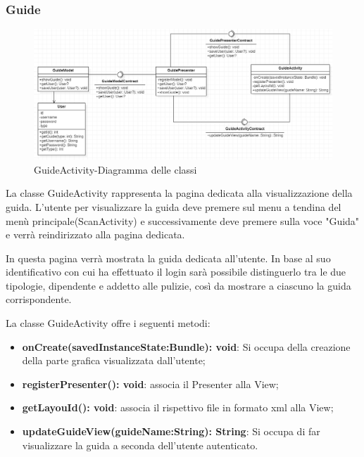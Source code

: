 \subsubsection{Guide}
\begin{figure}[H]
	\centering
	\includegraphics[width=16cm]{res/images/GuideClass.png}
	\caption{GuideActivity-Diagramma delle classi}
	\label{fig:GuideActivity-Diagramma delle classi}
\end{figure}
La classe GuideActivity rappresenta la pagina dedicata alla visualizzazione della guida.
L'utente per visualizzare la guida deve premere sul menu a tendina del menù principale(ScanActivity) e successivamente deve premere sulla voce "Guida" e verrà reindirizzato alla pagina dedicata.

In questa pagina verrà mostrata la guida dedicata all'utente. In base al suo identificativo con cui ha effettuato il login sarà possibile distinguerlo tra le due tipologie, dipendente e addetto alle pulizie, così da mostrare a ciascuno la guida corrispondente.

La classe GuideActivity offre i seguenti metodi:
\begin{itemize}
	\item \textbf{onCreate(savedInstanceState:Bundle): void}: Si occupa della creazione della parte grafica visualizzata dall'utente;
	\item \textbf{registerPresenter(): void}: associa il Presenter alla View;
	\item \textbf{getLayouId(): void}: associa il rispettivo file in formato xml alla View;
	\item \textbf{updateGuideView(guideName:String): String}: Si occupa di far visualizzare la guida a seconda dell'utente autenticato. 
\end{itemize}

